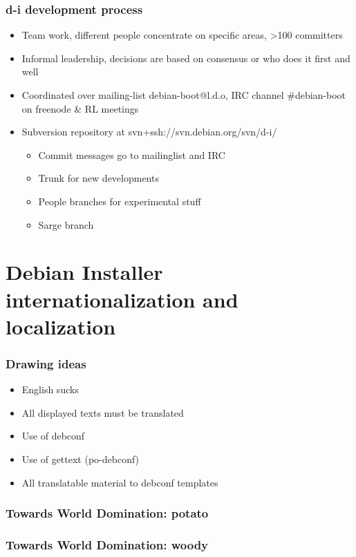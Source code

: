 \documentclass{beamer}
\begin{document}
\begin{frame}
  \frametitle{d-i development process}
	\begin{itemize}
	\item
		Team work, different people concentrate on specific areas, >100 committers
	\item
		Informal leadership, decisions are based on consensus or who does it first and well
	\item
		Coordinated over mailing-list debian-boot@l.d.o, IRC channel \#debian-boot on freenode \& RL meetings 
	\item
		Subversion repository at svn+ssh://svn.debian.org/svn/d-i/
		\begin{itemize}
			\item
				Commit messages go to mailinglist and IRC
			\item
				Trunk for new developments
			\item
				People branches for experimental stuff
			\item
				Sarge branch
		\end{itemize}
	\end{itemize}
\end{frame}



\section{Debian Installer internationalization and localization}

\begin{frame}
  \frametitle{Drawing ideas}
	\begin{itemize}
	\item
		English sucks
	\item
		All displayed texts must be translated
	\item
		Use of debconf
	\item
		Use of gettext (po-debconf)
	\item
		All translatable material to debconf templates
	\end{itemize}
\end{frame}

\begin{frame}
  \frametitle{Towards World Domination: potato}
\end{frame}

\begin{frame}
  \frametitle{Towards World Domination: woody}
\end{frame}
\end{document}
